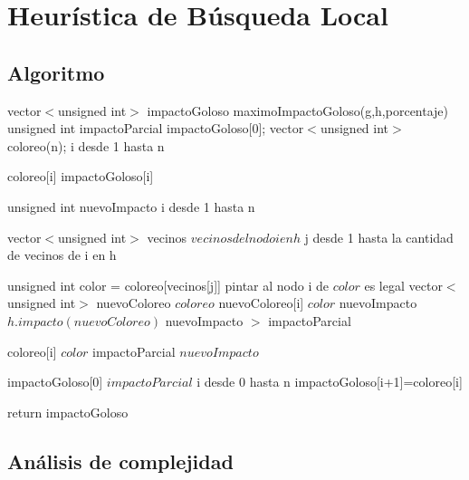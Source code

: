 \section{Heurística de Búsqueda Local}

\subsection{Algoritmo}

\begin{algorithm}[H]
\caption{} 
\begin{codebox}

\li
\li vector$<$unsigned int$>$ impactoGoloso  \gets maximoImpactoGoloso(g,h,porcentaje)
\li unsigned int impactoParcial \gets impactoGoloso[0];
\li vector$<$unsigned int$>$ coloreo(n);
\li
\li \For i desde 1 hasta n \Do
    
\li 	coloreo[i] \gets impactoGoloso[i]
    
    \End
\li

\li unsigned int nuevoImpacto 
\li
\li	\For i desde 1 hasta n \Do
	
\li
\li		vector$<$unsigned int$>$ vecinos \gets $vecinos del nodo i en h$
\li
\li 	\For j desde 1 hasta la cantidad de vecinos de i en h \Do

\li				unsigned int color = coloreo[vecinos[j]]
\li
\li				\If pintar al nodo i de $color$ es legal \Do			
\li						vector$<$unsigned int$>$ nuevoColoreo \gets $coloreo$
\li						nuevoColoreo[i] \gets $color$
\li                		nuevoImpacto \gets $h.impacto(nuevoColoreo)$
\li
\li                		\If nuevoImpacto $>$ impactoParcial \Do
                
\li                			coloreo[i] \gets $color$
\li                   			impactoParcial \gets $nuevoImpacto$
                   		\End
\li
                \End
        \End
    \End

\li
\li		impactoGoloso[0] \gets $impactoParcial$
\li
\li \For i desde 0 hasta n \Do
\li		impactoGoloso[i+1]=coloreo[i]
	\End    

\li
\li return impactoGoloso
\End
\end{codebox}
\end{algorithm}

\subsection{Análisis de complejidad}


